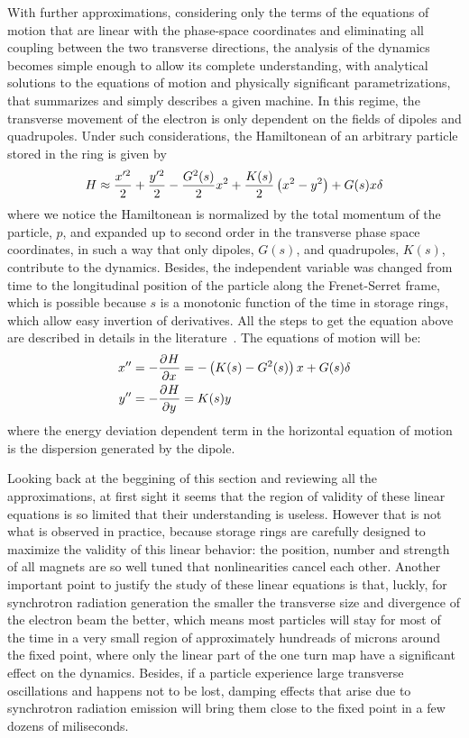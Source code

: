 	With further approximations, considering only the terms of the equations of motion that are linear with the phase-space coordinates and eliminating all coupling between the two transverse directions, the analysis of the dynamics becomes simple enough to allow its complete understanding, with analytical solutions to the equations of motion and physically significant parametrizations, that summarizes and simply describes a given machine. In this regime, the transverse movement of the electron is only dependent on the fields of dipoles and quadrupoles. Under such considerations, the Hamiltonean of an arbitrary particle stored in the ring is given by
    \begin{align}\label{eq:approximated_hamiltonean}
        H \approx \frac{x'^2}{2} + \frac{y'^2}{2} - \frac{G^2(s)}{2}x^2 + \frac{K(s)}{2}\left(x^2-y^2\right) + G(s)x\delta
    \end{align}
    where we notice the Hamiltonean is normalized by the total momentum of the particle, $p$, and expanded up to second order in the transverse phase space coordinates, in such a way that only dipoles, $G(s)$, and quadrupoles, $K(s)$, contribute to the dynamics. Besides, the independent variable was changed from time to the longitudinal position of the particle along the Frenet-Serret frame, which is possible because $s$ is a monotonic function of the time in storage rings, which allow easy invertion of derivatives. All the steps to get the equation above are described in details in the literature~\cite{LeeBook,Bengtssonpaper,WiedemannBook}. The equations of motion will be:
    \begin{align}\label{eq:linear_equation_motion}
        x'' &= -\frac{\partial^{{}}H}{\partial x^{{}}} = -\left(K(s)-G^2(s)\right)x + G(s)\delta\\\nonumber
        y'' &= -\frac{\partial^{{}}H}{\partial y^{{}}} = K(s)y
    \end{align}
    where the energy deviation dependent term in the horizontal equation of motion is the dispersion generated by the dipole.

	Looking back at the beggining of this section and reviewing all the approximations, at first sight it seems that the region of validity of these linear equations is so limited that their understanding is useless. However that is not what is observed in practice, because storage rings are carefully designed to maximize the validity of this linear behavior: the position, number and strength of all magnets are so well tuned that nonlinearities cancel each other. Another important point to justify the study of these linear equations is that, luckly, for synchrotron radiation generation the smaller the transverse size and divergence of the electron beam the better, which means most particles will stay for most of the time in a very small region of approximately hundreads of microns around the fixed point, where only the linear part of the one turn map have a significant effect on the dynamics. Besides, if a particle experience large transverse oscillations and happens not to be lost, damping effects that arise due to synchrotron radiation emission will bring them close to the fixed point in a few dozens of miliseconds.

